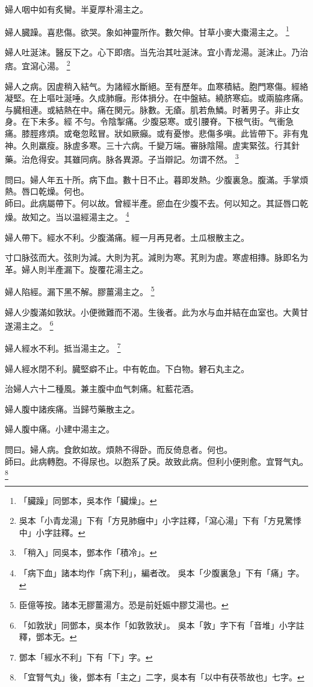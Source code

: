 婦人咽中如有炙臠。半夏厚朴湯主之。

婦人臓躁。喜悲傷。欲哭。象如神靈所作。數欠伸。甘草小麥大棗湯主之。
	\footnote{
		「臟躁」同鄧本，吳本作「臟燥」。
	}

婦人吐涎沫。醫反下之。心下即痞。当先治其吐涎沫。宜小青龙湯。涎沫止。乃治痞。宜瀉心湯。
	\footnote{
		吳本「小青龙湯」下有「方見肺癰中」小字註釋，「瀉心湯」下有「方見驚悸中」小字註釋。
	}

婦人之病。因虗稍入結气。为諸經水斷絕。至有歷年。血寒積結。胞門寒傷。經絡凝堅。在上嘔吐涎唾。久成肺癰。形体損分。在中盤結。繞脐寒疝。或兩脇疼痛。与臓相連。或結熱在中。痛在関元。脉數。无瘡。肌若魚鱗。时著男子。非止女身。在下未多。經{\sungii 𠊱}不勻。令陰掣痛。少腹惡寒。或引腰脊。下根气街。气衝急痛。膝脛疼煩。或奄忽眩冒。狀如厥癲。或有憂惨。悲傷多嗔。此皆帶下。非有鬼神。久則羸瘦。脉虗多寒。三十六病。千變万端。審脉陰陽。虗実緊弦。行其針藥。治危得安。其雖同病。脉各異源。子当辯記。勿谓不然。
	\footnote{
		「稍入」同吳本，鄧本作「積冷」。
	}

問曰。婦人年五十所。病下血。數十日不止。暮即发熱。少腹裏急。腹滿。手掌煩熱。唇口乾燥。何也。\\
師曰。此病屬帶下。何以故。曾經半產。瘀血在少腹不去。何以知之。其証唇口乾燥。故知之。当以温經湯主之。
	\footnote{
		「病下血」諸本均作「病下利」，編者改。
		吳本「少腹裏急」下有「痛」字。
	}

婦人帶下。經水不利。少腹滿痛。經一月再見者。土瓜根散主之。

寸口脉弦而大。弦則为減。大則为芤。減則为寒。芤則为虗。寒虗相摶。脉即名为革。婦人則半產漏下。旋覆花湯主之。

婦人陷經。漏下黑不解。膠薑湯主之。
	\footnote{
		臣億等按。諸本无膠薑湯{\khaai 方}。恐是前妊娠中膠艾湯也。
	}

婦人少腹滿如敦狀。小便微難而不渴。生後者。此为水与血并結在血室也。大黄甘遂湯主之。
	\footnote{
		「如敦狀」同鄧本，吳本作「如敦敦狀」。
		吳本「敦」字下有「音堆」小字註釋，鄧本无。
	}

婦人經水不利。抵当湯主之。
	\footnote{
		鄧本「經水不利」下有「下」字。
	}

婦人經水閉不利。臓堅癖不止。中有乾血。下白物。礬石丸主之。

治婦人六十二種風。兼主腹中血气刺痛。紅藍花酒。

婦人腹中諸疾痛。当歸芍藥散主之。

婦人腹中痛。小建中湯主之。

問曰。婦人病。食飲如故。煩熱不得卧。而反倚息者。何也。\\
師曰。此病轉胞。不得尿也。以胞系了戾。故致此病。但利小便則愈。宜腎气丸。
	\footnote{
		「宜腎气丸」後，鄧本有「主之」二字，吳本有「以中有茯苓故也」七字。
	}

